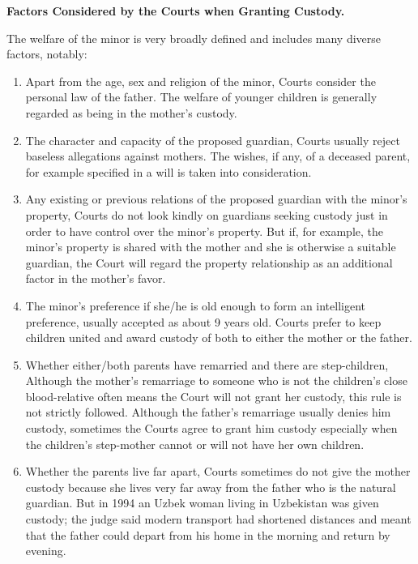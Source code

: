 \begin{multicols}{2}
{\normalsize\bfseries {Factors Considered by the Courts when Granting Custody.}}

\noi
The welfare of the minor is very broadly defined and includes many diverse factors, notably:

\begin{enumerate}
\item Apart from the age, sex and religion of the minor, Courts consider the personal law of the father. The welfare of younger children is generally regarded as being in the mother's custody.

\item The character and capacity of the proposed guardian, Courts usually reject baseless
allegations against mothers. The wishes, if any, of a deceased parent, for example
specified in a will is taken into consideration.

\newpage

\item Any existing or previous relations of the proposed guardian with the minor's property,
Courts do not look kindly on guardians seeking custody just in order to have control over
the minor's property. But if, for example, the minor's property is shared with the mother
and she is otherwise a suitable guardian, the Court will regard the property relationship as
an additional factor in the mother's favor.

\item The minor's preference if she/he is old enough to form an intelligent preference, usually
accepted as about 9 years old. Courts prefer to keep children united and award custody of
both to either the mother or the father.

\item Whether either/both parents have remarried and there are step-children, Although the
mother's remarriage to someone who is not the children's close blood-relative often means
the Court will not grant her custody, this rule is not strictly followed. Although the father's
remarriage usually denies him custody, sometimes the Courts agree to grant him custody
especially when the children's step-mother cannot or will not have her own children.

\item Whether the parents live far apart, Courts sometimes do not give the mother custody
because she lives very far away from the father who is the natural guardian. But in 1994
an Uzbek woman living in Uzbekistan was given custody; the judge said modern transport
had shortened distances and meant that the father could depart from his home in the
morning and return by evening.


\end{enumerate}
\end{multicols}
